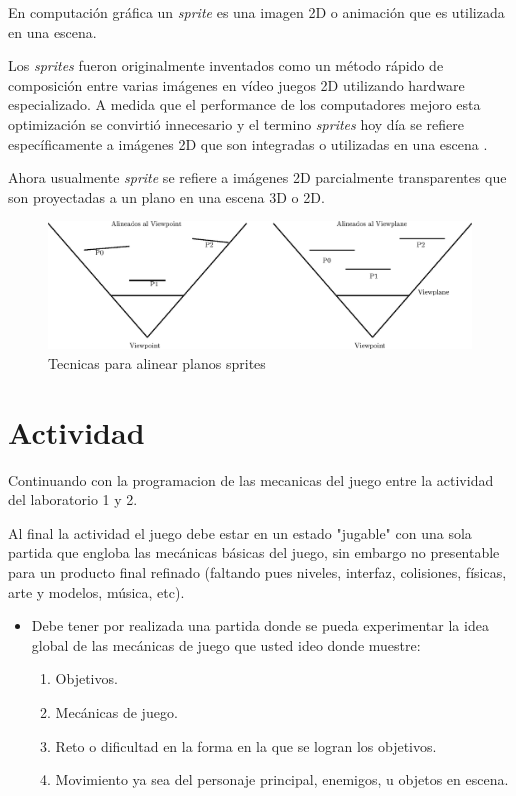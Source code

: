 En computación gráfica un \emph{sprite} es una imagen 2D o animación que es utilizada en una escena.

Los \emph{sprites} fueron originalmente inventados como un método rápido de composición entre varias imágenes en vídeo juegos 2D utilizando hardware especializado. A medida que el performance de los computadores mejoro esta optimización se convirtió innecesario y el termino \emph{sprites} hoy día se refiere específicamente a imágenes 2D que son integradas o utilizadas en una escena \cite{sprites_siggraph}.

Ahora usualmente \emph{sprite} se refiere a imágenes 2D parcialmente transparentes que son proyectadas a un plano en una escena 3D o 2D.~\\[1cm]
\begin{figure}[H]
\centering
\includegraphics[width=0.95\linewidth]{media/bills.eps} 
\caption{Tecnicas para alinear planos sprites}
\end{figure}

\section{Actividad}
Continuando con la programacion de las mecanicas del juego entre la actividad del laboratorio 1 y 2.

Al final la actividad el juego debe estar en un estado "jugable" con una sola partida que engloba las mecánicas básicas del juego, sin embargo no presentable para un producto final refinado (faltando pues niveles, interfaz, colisiones, físicas, arte y modelos, música, etc).

\begin{itemize}
\item Debe tener por realizada una partida donde se pueda experimentar la idea global de las mecánicas de juego que usted ideo donde muestre:
\begin{enumerate}
  \item Objetivos.
  \item Mecánicas de juego.
  \item Reto o dificultad en la forma en la que se logran los objetivos.
  \item Movimiento ya sea del personaje principal, enemigos, u objetos en escena.
\end{enumerate}
\end{itemize}

